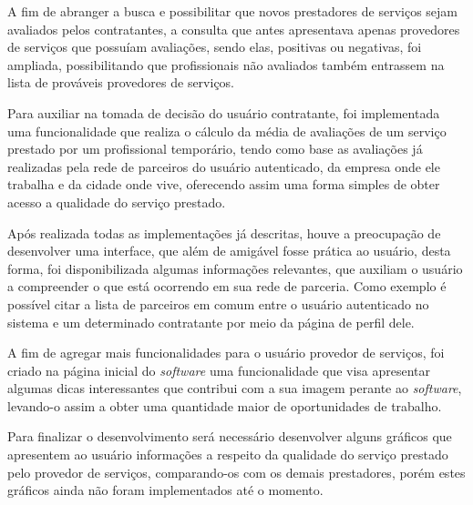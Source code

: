 \par A fim de abranger a busca e possibilitar que novos prestadores de serviços sejam avaliados pelos contratantes, a consulta que antes apresentava apenas provedores de serviços que possuíam avaliações, sendo elas, positivas ou negativas, foi ampliada, possibilitando que profissionais não avaliados também entrassem na lista de prováveis provedores de serviços.

\par Para auxiliar na tomada de decisão do usuário contratante, foi implementada uma funcionalidade que realiza o cálculo da média de avaliações de um serviço prestado por um profissional temporário, tendo como base as avaliações já realizadas pela rede de parceiros do usuário autenticado, da empresa onde ele trabalha e da cidade onde vive, oferecendo assim uma forma simples de obter acesso a qualidade do serviço prestado.

\par Após realizada todas as implementações já descritas, houve a preocupação de desenvolver uma interface, que além de amigável fosse prática ao usuário, desta forma, foi disponibilizada algumas informações relevantes, que auxiliam o usuário a compreender o que está ocorrendo em sua rede de parceria. Como exemplo é possível citar a lista de parceiros em comum entre o usuário autenticado no sistema e um determinado contratante por meio da página de perfil dele.

\par A fim de agregar mais funcionalidades para o usuário provedor de serviços, foi criado na página inicial do \textit{software} uma funcionalidade que visa apresentar algumas dicas interessantes que contribui com a sua imagem perante ao \textit{software}, levando-o assim a obter uma quantidade maior de oportunidades de trabalho.

\par Para finalizar o desenvolvimento será necessário desenvolver alguns gráficos que apresentem ao usuário informações a respeito da qualidade do serviço prestado pelo provedor de serviços, comparando-os com os demais prestadores, porém estes gráficos ainda não foram implementados até o momento.
